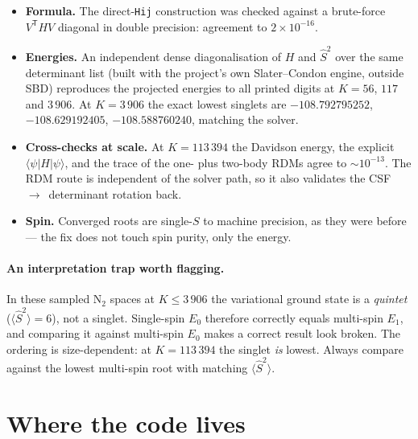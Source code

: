 \documentclass[11pt,a4paper]{article}
\newcommand{\Sop}{\hat{S}}
\newcommand{\code}[1]{\texttt{\small #1}}
\begin{document}
\begin{itemize}\itemsep3pt
  \item \textbf{Formula.} The direct-\code{Hij} construction was checked
        against a brute-force $V^{\mathsf T} H V$ diagonal in double precision:
        agreement to $2\times10^{-16}$.
  \item \textbf{Energies.} An independent dense diagonalisation of $H$ and
        $\Sop^2$ over the same determinant list (built with the project's own
        Slater--Condon engine, outside SBD) reproduces the projected energies
        to all printed digits at $K=56$, $117$ and $3\,906$. At $K=3\,906$ the
        exact lowest singlets are $-108.792795252$, $-108.629192405$,
        $-108.588760240$, matching the solver.
  \item \textbf{Cross-checks at scale.} At $K=113\,394$ the Davidson energy,
        the explicit $\langle\psi|H|\psi\rangle$, and the trace of the
        one- plus two-body RDMs agree to ${\sim}10^{-13}$. The RDM route is
        independent of the solver path, so it also validates the
        CSF~$\to$~determinant rotation back.
  \item \textbf{Spin.} Converged roots are single-$S$ to machine precision, as
        they were before --- the fix does not touch spin purity, only the
        energy.
\end{itemize}

\paragraph{An interpretation trap worth flagging.}
In these sampled N$_2$ spaces at $K \le 3\,906$ the variational ground state
is a \emph{quintet} ($\langle \Sop^2\rangle = 6$), not a singlet. Single-spin
$E_0$ therefore correctly equals multi-spin $E_1$, and comparing it against
multi-spin $E_0$ makes a correct result look broken. The ordering is
size-dependent: at $K=113\,394$ the singlet \emph{is} lowest. Always compare
against the lowest multi-spin root with matching $\langle \Sop^2\rangle$.

\section{Where the code lives}
\end{document}
